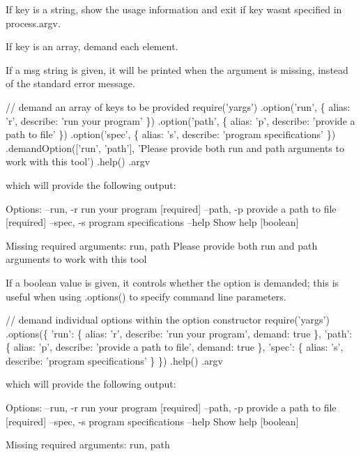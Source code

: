 If {\ttfamily key} is a string, show the usage information and exit if {\ttfamily key} wasn\textquotesingle{}t specified in {\ttfamily process.\+argv}.

If {\ttfamily key} is an array, demand each element.

If a {\ttfamily msg} string is given, it will be printed when the argument is missing, instead of the standard error message.


\begin{DoxyCode}
// demand an array of keys to be provided
require('yargs')
  .option('run', \{
    alias: 'r',
    describe: 'run your program'
  \})
  .option('path', \{
    alias: 'p',
    describe: 'provide a path to file'
  \})
  .option('spec', \{
    alias: 's',
    describe: 'program specifications'
  \})
  .demandOption(['run', 'path'], 'Please provide both run and path arguments to work with this tool')
  .help()
  .argv
\end{DoxyCode}
 which will provide the following output\+: 
\begin{DoxyCode}
Options:
  --run, -r   run your program                [required]
  --path, -p  provide a path to file          [required]
  --spec, -s  program specifications
  --help      Show help                        [boolean]

  Missing required arguments: run, path
  Please provide both run and path arguments to work with this tool
\end{DoxyCode}


If a {\ttfamily boolean} value is given, it controls whether the option is demanded; this is useful when using {\ttfamily .options()} to specify command line parameters.


\begin{DoxyCode}
// demand individual options within the option constructor
require('yargs')
  .options(\{
    'run': \{
      alias: 'r',
      describe: 'run your program',
      demand: true
    \},
    'path': \{
      alias: 'p',
      describe: 'provide a path to file',
      demand: true
    \},
    'spec': \{
      alias: 's',
      describe: 'program specifications'
    \}
  \})
  .help()
  .argv
\end{DoxyCode}
 which will provide the following output\+: 
\begin{DoxyCode}
Options:
  --run, -r   run your program                                       [required]
  --path, -p  provide a path to file                                 [required]
  --spec, -s  program specifications
  --help      Show help                                               [boolean]

Missing required arguments: run, path
\end{DoxyCode}


